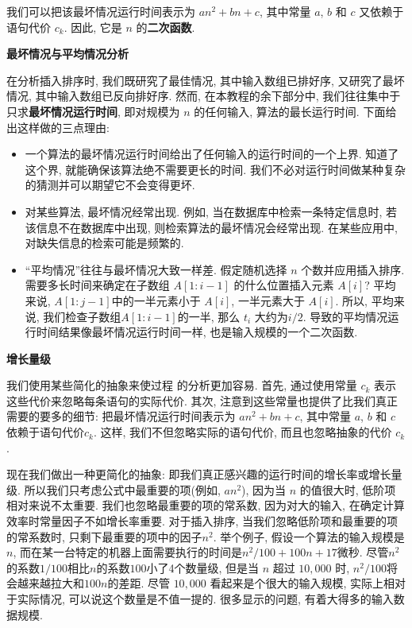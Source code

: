 \documentclass[oneside,10pt,fontset=none]{ctexbook}
\begin{document}
我们可以把该最坏情况运行时间表示为 $an^2+bn+c$, 其中常量 $a$, $b$ 和 $c$ 又依赖于语句代价 $c_k$. 因此, 它是 $n$ 的\textbf{二次函数}.

\textbf{最坏情况与平均情况分析}

在分析插入排序时, 我们既研究了最佳情况, 其中输入数组已排好序, 又研究了最坏情况, 其中输入数组已反向排好序. 然而, 在本教程的余下部分中, 我们往往集中于只求\textbf{最坏情况运行时间}, 即对规模为 $n$ 的任何输入, 算法的最长运行时间. 下面给出这样做的三点理由:

\begin{itemize}
    \item 一个算法的最坏情况运行时间给出了任何输入的运行时间的一个上界. 知道了这个界, 就能确保该算法绝不需要更长的时间. 我们不必对运行时间做某种复杂的猜测并可以期望它不会变得更坏.
    \item 对某些算法, 最坏情况经常出现. 例如, 当在数据库中检索一条特定信息时, 若该信息不在数据库中出现, 则检索算法的最坏情况会经常出现. 在某些应用中, 对缺失信息的检索可能是频繁的.
    \item ``平均情况''往往与最坏情况大致一样差. 假定随机选择 $n$ 个数并应用插入排序. 需要多长时间来确定在子数组 $A[1:i-1]$ 的什么位置插入元素 $A[i]$? 平均来说, $A[1:j-1]$中的一半元素小于 $A[i]$, 一半元素大于 $A[i]$. 所以, 平均来说, 我们检查子数组$A[1:i-1]$的一半, 那么 $t_i$ 大约为$i/2$. 导致的平均情况运行时间结果像最坏情况运行时间一样, 也是输入规模的一个二次函数.
\end{itemize}

\textbf{增长量级}

我们使用某些简化的抽象来使过程  的分析更加容易. 首先, 通过使用常量 $c_k$ 表示这些代价来忽略每条语句的实际代价. 其次, 注意到这些常量也提供了比我们真正需要的要多的细节: 把最坏情况运行时间表示为 $an^2+bn+c$, 其中常量 $a$, $b$ 和 $c$ 依赖于语句代价$c_k$. 这样, 我们不但忽略实际的语句代价, 而且也忽略抽象的代价 $c_k$.

现在我们做出一种更简化的抽象: 即我们真正感兴趣的运行时间的增长率或增长量级. 所以我们只考虑公式中最重要的项(例如, $an^2$), 因为当 $n$ 的值很大时, 低阶项相对来说不太重要. 我们也忽略最重要的项的常系数, 因为对大的输入, 在确定计算效率时常量因子不如增长率重要. 对于插入排序, 当我们忽略低阶项和最重要的项的常系数时, 只剩下最重要的项中的因子$n^2$. 举个例子, 假设一个算法的输入规模是$n$, 而在某一台特定的机器上面需要执行的时间是$n^2/100+100n+17$微秒. 尽管$n^2$的系数$1/100$相比$n$的系数$100$小了4个数量级, 但是当 $n$ 超过 $10,000$ 时, $n^2/100$将会越来越拉大和$100n$的差距. 尽管 $10,000$ 看起来是个很大的输入规模, 实际上相对于实际情况, 可以说这个数量是不值一提的. 很多显示的问题, 有着大得多的输入数据规模.
\end{document}
